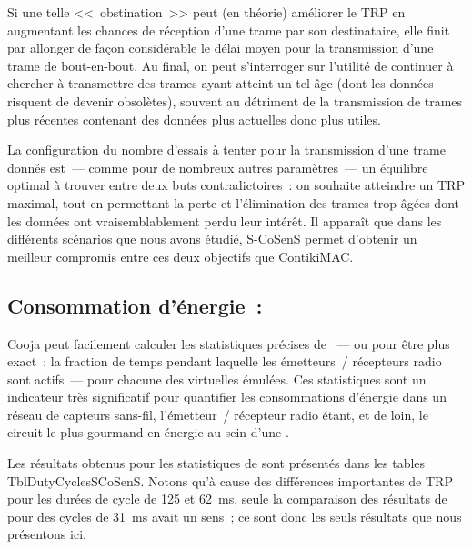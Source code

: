 Si une telle <<~obstination~>> peut (en théorie) améliorer le TRP en
augmentant les chances de réception d'une trame par son destinataire,
elle finit par allonger de façon considérable le délai moyen pour la
transmission d'une trame de bout-en-bout. Au final, on peut s'interroger
sur l'utilité de continuer à chercher à transmettre des trames ayant
atteint un tel âge (dont les données risquent de devenir obsolètes),
souvent au détriment de la transmission de trames plus récentes
contenant des données plus actuelles donc plus utiles.

La configuration du nombre d'essais à tenter pour la transmission
d'une trame donnés est~--- comme pour de nombreux autres paramètres~---
un équilibre optimal à trouver entre deux buts contradictoires~: on
souhaite atteindre un TRP maximal, tout en permettant la perte et
l'élimination des trames trop âgées dont les données ont vraisemblablement
perdu leur intérêt. Il apparaît que dans les différents scénarios que nous
avons étudié, S-CoSenS permet d'obtenir un meilleur compromis entre
ces deux objectifs que ContikiMAC.


\subsection{Consommation d'énergie~: }
\label{SubsecDutyCycles}

Cooja peut facilement calculer les statistiques précises de ~--- ou pour être plus exact~: la fraction de temps pendant laquelle
les émetteurs~/ récepteurs radio sont actifs~--- pour chacune des
 virtuelles émulées. Ces statistiques sont un indicateur
très significatif pour quantifier les consommations d'énergie dans un
réseau de capteurs sans-fil, l'émetteur~/ récepteur radio étant, et de
loin, le circuit le plus gourmand en énergie au sein d'une .

Les résultats obtenus pour les statistiques de 
sont présentés dans les tables 
{TblDutyCyclesSCoSenS}. Notons qu'à cause des différences
importantes de TRP pour les durées de cycle de 125 et 62~ms, seule
la comparaison des résultats de  pour des cycles de
31~ms avait un sens~; ce sont donc les seuls résultats que nous
présentons ici.

